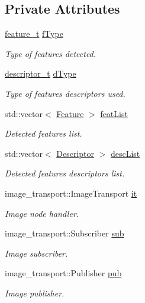 \subsection*{\-Private \-Attributes}
\begin{DoxyCompactItemize}
\item 
\hyperlink{namespaceLRM_a8eb6956b84fb7d27bce5af771937794f}{feature\-\_\-t} \hyperlink{classLRM_1_1Frame_a4984e53e358e726cbf67a55e1cb4f01a}{f\-Type}
\begin{DoxyCompactList}\small\item\em \-Type of features detected. \end{DoxyCompactList}\item 
\hyperlink{namespaceLRM_ad31d475a7f32e1bd208beb34aabc6fa9}{descriptor\-\_\-t} \hyperlink{classLRM_1_1Frame_abf992f7a74b18ad8eb8baeab274e2a1b}{d\-Type}
\begin{DoxyCompactList}\small\item\em \-Type of features descriptors used. \end{DoxyCompactList}\item 
std\-::vector$<$ \hyperlink{classLRM_1_1Feature}{\-Feature} $>$ \hyperlink{classLRM_1_1Frame_ad52722b8e517f54086604ff8c3d524ad}{feat\-List}
\begin{DoxyCompactList}\small\item\em \-Detected features list. \end{DoxyCompactList}\item 
std\-::vector$<$ \hyperlink{classLRM_1_1Descriptor}{\-Descriptor} $>$ \hyperlink{classLRM_1_1Frame_ad7f4cd20847b05393d8c0e49e4a07374}{desc\-List}
\begin{DoxyCompactList}\small\item\em \-Detected features descriptors list. \end{DoxyCompactList}\item 
image\-\_\-transport\-::\-Image\-Transport \hyperlink{classLRM_1_1Frame_a9a85162296d550daca6fcf0e39a34f5a}{it}
\begin{DoxyCompactList}\small\item\em \-Image node handler. \end{DoxyCompactList}\item 
image\-\_\-transport\-::\-Subscriber \hyperlink{classLRM_1_1Frame_afde5ec8c81b21aa924f5b054b31e055a}{sub}
\begin{DoxyCompactList}\small\item\em \-Image subscriber. \end{DoxyCompactList}\item 
image\-\_\-transport\-::\-Publisher \hyperlink{classLRM_1_1Frame_a70a2be50521677bd21c4853ce2ccb0f4}{pub}
\begin{DoxyCompactList}\small\item\em \-Image publisher. \end{DoxyCompactList}\end{DoxyCompactItemize}


